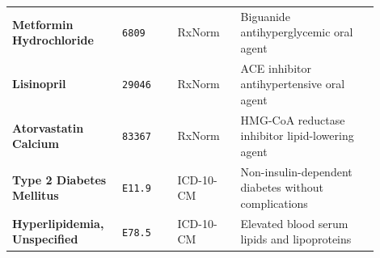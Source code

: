 \begin{longtable}{@{}p{0.25\linewidth} p{0.14\linewidth} p{0.16\linewidth} p{0.35\linewidth}@{}}
\textbf{Metformin Hydrochloride} & \texttt{6809} & RxNorm & Biguanide antihyperglycemic oral agent \\
\textbf{Lisinopril} & \texttt{29046} & RxNorm & ACE inhibitor antihypertensive oral agent \\
\textbf{Atorvastatin Calcium} & \texttt{83367} & RxNorm & HMG-CoA reductase inhibitor lipid-lowering agent \\
\textbf{Type 2 Diabetes Mellitus} & \texttt{E11.9} & ICD-10-CM & Non-insulin-dependent diabetes without complications \\
\textbf{Hyperlipidemia, Unspecified} & \texttt{E78.5} & ICD-10-CM & Elevated blood serum lipids and lipoproteins \\
\bottomrule
\end{longtable}
\normalsize
